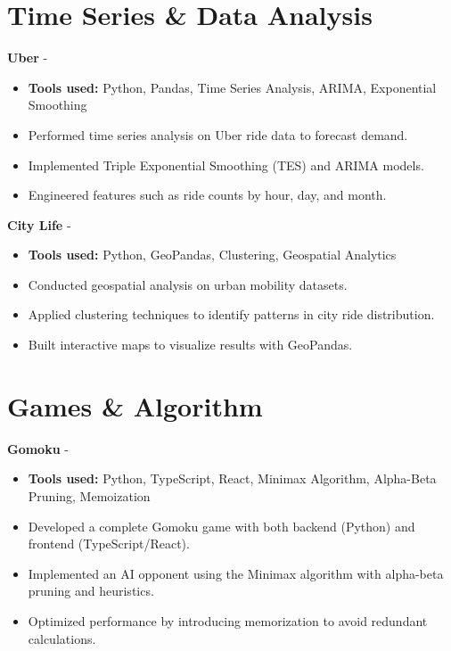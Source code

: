 \documentclass[a4paper,11pt]{article}%
\begin{document}
\section*{Time Series \& Data Analysis}%
%
\noindent \textbf{Uber} - \href{https://github.com/sboof911/Uber}{{}}%
\begin{itemize}[leftmargin=2em,label={},parsep=0pt,topsep=1em]%
\item \textbf{Tools used:} Python, Pandas, Time Series Analysis, ARIMA, Exponential Smoothing%
\item Performed time series analysis on Uber ride data to forecast demand.%
\item Implemented Triple Exponential Smoothing (TES) and ARIMA models.%
\item Engineered features such as ride counts by hour, day, and month.%
\end{itemize}%
%
\noindent \textbf{City Life} - \href{https://github.com/sboof911/City-Life}{{}}%
\begin{itemize}[leftmargin=2em,label={},parsep=0pt,topsep=1em]%
\item \textbf{Tools used:} Python, GeoPandas, Clustering, Geospatial Analytics%
\item Conducted geospatial analysis on urban mobility datasets.%
\item Applied clustering techniques to identify patterns in city ride distribution.%
\item Built interactive maps to visualize results with GeoPandas.%
\end{itemize}%
\section*{Games \& Algorithm}%
%
\noindent \textbf{Gomoku} - \href{https://github.com/sboof911/Gomoku}{{}}%
\begin{itemize}[leftmargin=2em,label={},parsep=0pt,topsep=1em]%
\item \textbf{Tools used:} Python, TypeScript, React, Minimax Algorithm, Alpha-Beta Pruning, Memoization%
\item Developed a complete Gomoku game with both backend (Python) and frontend (TypeScript/React).%
\item Implemented an AI opponent using the Minimax algorithm with alpha-beta pruning and heuristics.%
\item Optimized performance by introducing memorization to avoid redundant calculations.%
\end{itemize}%
\end{document}
